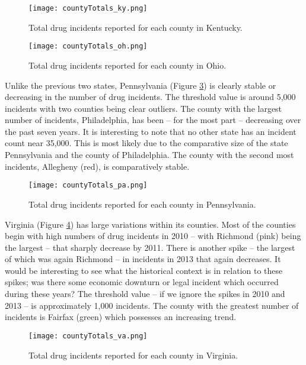 \documentclass[12pt, letterpaper]{article}
\begin{document}
   \begin{figure}[H]
    \centering
    \texttt{[image: countyTotals\_ky.png]}
    \caption{Total drug incidents reported for each county in Kentucky.}
    \label{fig:ky}
    \end{figure}

    \begin{figure}[H]
    \centering
    \texttt{[image: countyTotals\_oh.png]}
    \caption{Total drug incidents reported for each county in Ohio.}
    \label{fig:oh}
    \end{figure}
    
\newpage    
Unlike the previous two states, Pennsylvania (Figure \ref{fig:pa}) is clearly stable or decreasing in the number of drug incidents. The threshold value is around 5,000 incidents with two counties being clear outliers. The county with the largest number of incidents, Philadelphia, has been -- for the most part -- decreasing over the past seven years. It is interesting to note that no other state has an incident count near 35,000. This is most likely due to the comparative size of the state Pennsylvania and the county of Philadelphia. The county with the second most incidents, Allegheny (red), is comparatively stable.

   \begin{figure}[h!]
    \centering
    \texttt{[image: countyTotals\_pa.png]}
    \caption{Total drug incidents reported for each county in Pennsylvania.}
    \label{fig:pa}
    \end{figure}

Virginia (Figure \ref{fig:va}) has large variations within its counties. Most of the counties begin with high numbers of drug incidents in 2010  -- with Richmond (pink) being the largest -- that sharply decrease by 2011. There is another spike -- the largest of which was again Richmond -- in incidents in 2013 that again decreases. It would be interesting to see what the historical context is in relation to these spikes; was there some economic downturn or legal incident which occurred during these years? The threshold value -- if we ignore the spikes in 2010 and 2013 -- is approximately 1,000 incidents. The county with the greatest number of incidents is Fairfax (green) which possesses an increasing trend.

    \begin{figure}[H]
    \centering
    \texttt{[image: countyTotals\_va.png]}
    \caption{Total drug incidents reported for each county in Virginia.}
    \label{fig:va}
    \end{figure}
\end{document}
